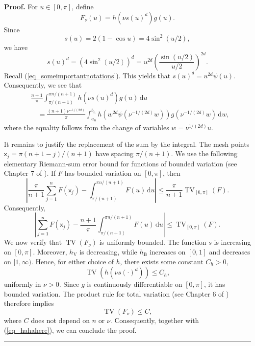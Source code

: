 \documentclass[11pt]{article}
\newcommand{\sfx}{\mathsf{x}}
\newenvironment{proof}[1][Proof]{\noindent\textbf{#1.} }{\ \rule{0.5em}{0.5em}}
\numberwithin{equation}{section}
\numberwithin{figure}{section}
\begin{document}
\begin{proof}
For \(u\in[0,\pi]\), define
\[
F_{\nu}(u)=h(\nu s(u)^d)g(u).
\]
Since
\begin{equation*}
s(u)=2(1-\cos u)=4\sin^2(u/2),
\end{equation*}
we have
\begin{equation*}
s(u)^d
=
\left(4\sin^2(u/2)\right)^d
=
u^{2d}
\left(
\frac{\sin(u/2)}{u/2}
\right)^{2d}.
\end{equation*}
Recall (\ref{eq_someimportantnotations}). This yields that $s(u)^d=u^{2d}\psi(u)$. Consequently, we see that 
\begin{equation}\label{eq_hahahere}
\begin{aligned}
&\frac{n+1}{\pi}
\int_{\pi/(n+1)}^{\pi n/(n+1)}
h(\nu s(u)^d)g(u)\,\mathrm{d}u \\
&\quad=
\frac{(n+1)\nu^{-1/(2d)}}{\pi}
\int_{a_n}^{b_n}
h(w^{2d}\psi(\nu^{-1/(2d)}w))
g(\nu^{-1/(2d)}w)\,\mathrm{d}w,
\end{aligned}
\end{equation}
where the equality follows from the change of variables
\(w=\nu^{1/(2d)}u\).


It remains to justify the replacement of the sum by the integral.
The mesh points \(\sfx_j=\pi(n+1-j)/(n+1)\) have spacing
\(\pi/(n+1)\). We use the following elementary Riemann-sum error bound for functions of
bounded variation (see Chapter 7 of \cite{Apostol1974}). If \(F\) has bounded variation on \([0,\pi]\), then
\begin{equation*}
\left|
\frac{\pi}{n+1}\sum_{j=1}^n F(\sfx_j)
-
\int_{\pi/(n+1)}^{\pi n/(n+1)}F(u)\,\mathrm{d}u
\right|
\leq
\frac{\pi}{n+1}
\operatorname{TV}_{[0,\pi]}(F).
\end{equation*}
Consequently,
\begin{equation*}
\left|
\sum_{j=1}^n F(\sfx_j)
-
\frac{n+1}{\pi}
\int_{\pi/(n+1)}^{\pi n/(n+1)}F(u)\,\mathrm{d}u
\right|
\leq
\operatorname{TV}_{[0,\pi]}(F).
\end{equation*} 
We now verify that \(\operatorname{TV}(F_{\nu})\) is uniformly
bounded. The function \(s\) is increasing on \([0,\pi]\). Moreover,
\(h_{\mathrm{V}}\) is decreasing, while \(h_{\mathrm{B}}\) increases
on \([0,1]\) and decreases on \([1,\infty)\). Hence, for either choice
of \(h\), there exists some constant $C_h>0,$
\[
\operatorname{TV}(h(\nu s(\cdot)^d))\leq C_h,
\]
uniformly in \(\nu>0\). Since \(g\) is continuously differentiable on
\([0,\pi]\), it has bounded variation. The product rule for total
variation (see Chapter 6 of \cite{Apostol1974}) therefore implies
\[
\operatorname{TV}(F_{\nu})\leq C,
\]
where \(C\) does not depend on \(n\) or \(\nu\). Consequently, together with (\ref{eq_hahahere}), we can conclude the proof. 
\end{proof}
\end{document}
